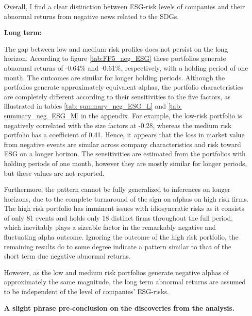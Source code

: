 Overall, I find a clear distinction between ESG-risk levels of companies and their abnormal returns from negative news related to the SDGs. 

\textbf{Long term:}

The gap between low and medium risk profiles does not persist on the long horizon. According to figure \ref{tab:FF5_neg_ESG} these portfolios generate abnormal returns of -0.64\% and -0.61\%, respectively, with a holding period of one month. The outcomes are similar for longer holding periods. 
Although the portfolios generate approximately equivalent alphas, the portfolio characteristics are completely different according to their sensitivities to the five factors, as illustrated in tables \ref{tab: summary_neg_ESG_L} and \ref{tab: summary_neg_ESG_M} in the appendix. For example, the low-risk portfolio is negatively correlated with the size factors at -0.28, whereas the medium risk portfolio has a coefficient of 0.41. Hence, it appears that the loss in market value from negative events are similar across company characteristics and risk toward ESG on a longer horizon. The sensitivities are estimated from the portfolios with holding periods of one month, however they are mostly similar for longer periods, but these values are not reported. 

Furthermore, the pattern cannot be fully generalized to inferences on longer horizons, due to the complete turnaround of the sign on alphas on high risk firms. The high risk portfolio has imminent issues with idiosyncratic risks as it consists of only 81 events and holds only 18 distinct firms throughout the full period, which inevitably plays a sizeable factor in the remarkably negative and fluctuating alpha outcome. Ignoring the outcome of the high risk portfolio, the remaining results do to some degree indicate a pattern similar to that of the short term due negative abnormal returns.

However, as the low and medium risk portfolios generate negative alphas of approximately the same magnitude, the long term abnormal returns are assumed to be independent of the level of companies' ESG-risks. 


\textbf{A slight phrase pre-conclusion on the discoveries from the analysis.}





